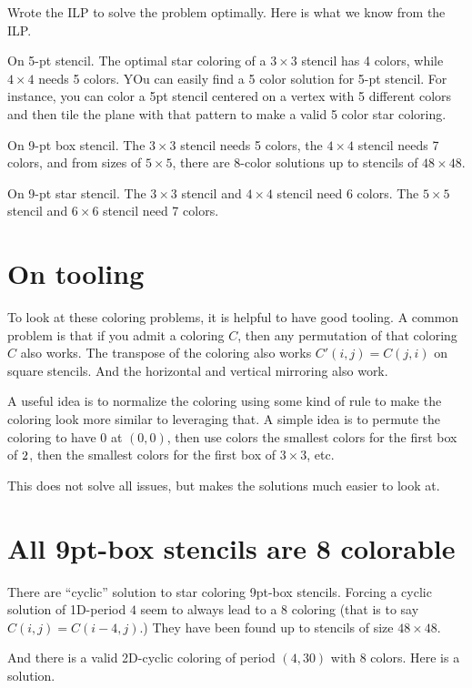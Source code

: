 \documentclass{article}
\begin{document}
Wrote the ILP to solve the problem optimally. Here is what we know
from the ILP.

On 5-pt stencil. The optimal star coloring of a $3 \times 3$ stencil
has 4 colors, while $4 \times 4$ needs 5 colors. YOu can easily find a
5 color solution for 5-pt stencil. For instance, you can color a 5pt stencil
centered on a vertex with 5 different colors and then tile the plane
with that pattern to make a valid 5 color star coloring.

On 9-pt box stencil. The $3 \times 3$ stencil needs 5 colors, the $4
\times 4$ stencil needs 7 colors, and from sizes of $5 \times 5$,
there are 8-color solutions up to stencils of $48 \times 48$.

On 9-pt star stencil. The $3 \times 3$ stencil and $4 \times 4$
stencil need 6 colors. The $5 \times 5$ stencil and $6 \times 6$
stencil need 7 colors. 
\section{On tooling}

To look at these coloring problems, it is helpful to have good
tooling. A common problem is that if you admit a coloring $C$, then
any permutation of that coloring $C$ also works. The transpose of the
coloring also works $C'(i,j) = C(j,i)$ on square stencils. And the
horizontal and vertical mirroring also work.

A useful idea is to normalize the coloring using some kind of rule to
make the coloring look more similar to leveraging that. A simple idea
is to permute the coloring to have 0 at $(0,0)$, then use colors the
smallest colors for the first box of $2\time 2$, then the smallest
colors for the first box of $3 \times 3$, etc.

This does not solve all issues, but makes the solutions much easier to
look at.

\section{All 9pt-box stencils are 8 colorable}

There are ``cyclic'' solution to star coloring 9pt-box
stencils. Forcing a cyclic solution of 1D-period $4$ seem to always
lead to a 8 coloring (that is to say $C(i,j) = C(i-4,j)$.) They have
been found up to stencils of size $48 \times 48$.

And there is a valid 2D-cyclic coloring of period $(4,30)$ with 8
colors. Here is a solution.
\end{document}

